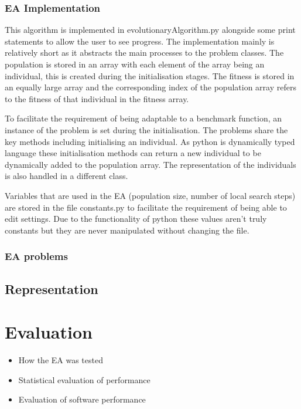 \documentclass[a4paper]{article}
\begin{document}
\subsubsection{EA Implementation}
\par
This algorithm is implemented in evolutionaryAlgorithm.py alongside some print statements to allow the user to see progress.
The implementation mainly is relatively short as it abstracts the main processes to the problem classes.
The population is stored in an array with each element of the array being an individual, this is created during the initialisation stages.
The fitness is stored in an equally large array and the corresponding index of the population array refers to the fitness of that individual in the fitness array.
\par
To facilitate the requirement of being adaptable to a benchmark function, an instance of the problem is set during the initialisation.
The problems share the key methods including initialising an individual.
As python is dynamically typed language these initialisation methods can return a new individual to be dynamically added to the population array.
The representation of the individuals is also handled in a different class.
\par
Variables that are used in the EA (population size, number of local search steps) are stored in the file constants.py to facilitate the requirement of being able to edit settings.
Due to the functionality of python these values aren't truly constants but they are never manipulated without changing the file.
\subsubsection{EA problems}

\subsection{Representation}


\section{Evaluation}
\begin{itemize}
	\item How the EA was tested
	\item Statistical evaluation of performance
	\item Evaluation of software performance
\end{itemize}
\end{document}
